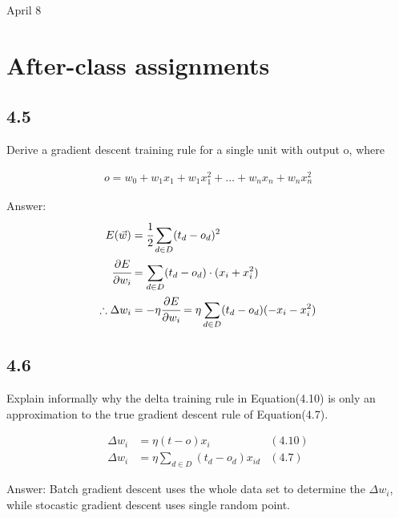 \univlogo

{\Huge April 8}\vspace{5mm}

\section*{After-class assignments}

\subsection*{4.5}

Derive a gradient descent training rule for a single unit with output o, where

\begin{equation}
\begin{aligned}
    o=w_0+w_1x_1+w_1x_1^2+\dots+w_nx_n+w_nx_n^2
\end{aligned}
\end{equation}

Answer:
\begin{equation}
\begin{aligned}
    E(\vec{w})&=\cfrac{1}{2}\sum_{d\in D}(t_d-o_d)^2\\
    \cfrac{\partial E}{\partial w_i}&=\sum_{d\in D}(t_d-o_d)\cdot(x_i+x_i^2)\\
    \therefore \Delta w_i&=-\eta\cfrac{\partial E}{\partial w_i}=\eta\sum_{d\in D}(t_d-o_d)(-x_i-x_i^2)
\end{aligned}
\end{equation}

\subsection*{4.6}

Explain informally why the delta training rule in Equation(4.10) is only an approximation to the true gradient descent rule of Equation(4.7).

\begin{equation}
\begin{aligned}
    \Delta w_i&=\eta(t-o)x_i &(4.10)\\
    \Delta w_i&=\eta\sum_{d\in D}(t_d-o_d)x_{id} &(4.7)    \nonumber
\end{aligned}
\end{equation}

Answer:
Batch gradient descent uses the whole data set to determine the $\Delta w_i$, while stocastic gradient descent uses single random point.

